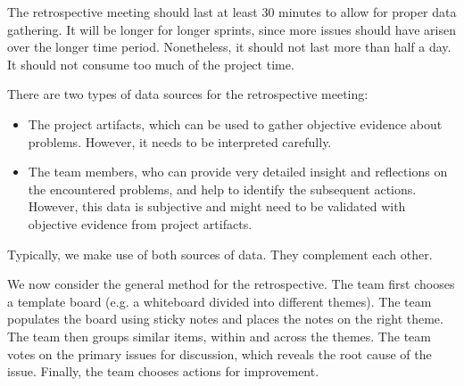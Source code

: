 \documentclass[a4paper, openany]{memoir}
\begin{document}
The retrospective meeting should last at least 30 minutes to allow for proper data gathering. It will be longer for longer sprints, since more issues should have arisen over the longer time period. Nonetheless, it should not last more than half a day. It should not consume too much of the project time.

There are two types of data sources for the retrospective meeting:
\begin{itemize}
    \item The project artifacts, which can be used to gather objective evidence about problems. However, it needs to be interpreted carefully.
    \item The team members, who can provide very detailed insight and reflections on the encountered problems, and help to identify the subsequent actions. However, this data is subjective and might need to be validated with objective evidence from project artifacts.
\end{itemize}
Typically, we make use of both sources of data. They complement each other.

We now consider the general method for the retrospective. The team first chooses a template board (e.g. a whiteboard divided into different themes). The team populates the board using sticky notes and places the notes on the right theme. The team then groups similar items, within and across the themes. The team votes on the primary issues for discussion, which reveals the root cause of the issue. Finally, the team chooses actions for improvement.
\end{document}
